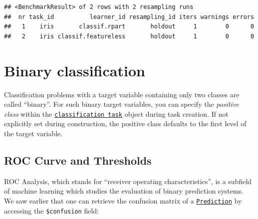 \documentclass[
]{scrbook}
\newenvironment{Shaded}{\begin{snugshade}}{\end{snugshade}}
\newcommand{\AttributeTok}[1]{\textcolor[rgb]{0.77,0.63,0.00}{#1}}
\newcommand{\CommentTok}[1]{\textcolor[rgb]{0.56,0.35,0.01}{\textit{#1}}}
\newcommand{\FunctionTok}[1]{\textcolor[rgb]{0.00,0.00,0.00}{#1}}
\newcommand{\NormalTok}[1]{#1}
\newcommand{\OtherTok}[1]{\textcolor[rgb]{0.56,0.35,0.01}{#1}}
\newcommand{\SpecialCharTok}[1]{\textcolor[rgb]{0.00,0.00,0.00}{#1}}
\newcommand{\StringTok}[1]{\textcolor[rgb]{0.31,0.60,0.02}{#1}}
\renewenvironment{Shaded} {\begin{snugshade}\small} {\end{snugshade}}
\begin{document}
\begin{verbatim}
## <BenchmarkResult> of 2 rows with 2 resampling runs
##  nr task_id          learner_id resampling_id iters warnings errors
##   1    iris       classif.rpart       holdout     1        0      0
##   2    iris classif.featureless       holdout     1        0      0
\end{verbatim}

\hypertarget{binary-classification}{%
\section{Binary classification}\label{binary-classification}}

Classification problems with a target variable containing only two classes are called ``binary''.
For such binary target variables, you can specify the \emph{positive class} within the \href{https://mlr3.mlr-org.com/reference/TaskClassif.html}{\texttt{classification\ task}} object during task creation.
If not explicitly set during construction, the positive class defaults to the first level of the target variable.

\begin{Shaded}
\end{Shaded}

\hypertarget{binary-roc}{%
\subsection{ROC Curve and Thresholds}\label{binary-roc}}

ROC Analysis, which stands for ``receiver operating characteristics'', is a subfield of machine learning which studies the evaluation of binary prediction systems.
We saw earlier that one can retrieve the confusion matrix of a \href{https://mlr3.mlr-org.com/reference/Prediction.html}{\texttt{Prediction}} by accessing the \texttt{\$confusion} field:
\end{document}
